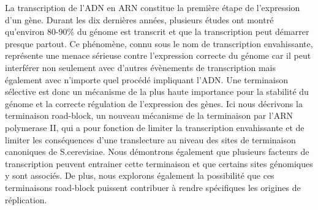 La transcription de l’ADN en ARN constitue la première étape de l’expression d’un gène. Durant les dix dernières années, plusieurs études ont montré qu'environ 80-90\% du génome est transcrit et que la transcription peut démarrer presque partout. Ce phénomène, connu sous le nom de transcription envahissante, représente une menace sérieuse contre l'expression correcte du génome car il peut interférer non seulement avec d’autres évènements de transcription mais également  avec n’importe quel procédé impliquant l’ADN. Une terminaison sélective est donc un mécanisme de la plus haute importance pour la stabilité du génome et la correcte régulation de l'expression des gènes. Ici nous décrivons la terminaison road-block, un nouveau mécanisme de la terminaison par l'ARN polymerase II, qui a pour fonction de limiter la transcription envahissante et de limiter les conséquences d’une translecture au niveau des sites de terminaison canoniques de S.cerevisiae. Nous démontrons également que plusieurs facteurs de transcription peuvent entrainer cette terminaison et que certains sites génomiques y sont associés. De plus, nous explorons également la possibilité que ces terminaisons road-block puissent contribuer à rendre spécifiques les origines de réplication.